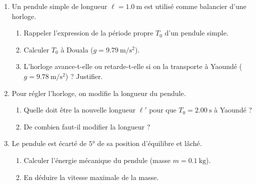 \begin{enumerate}[label=\arabic*)]
    \item Un pendule simple de longueur $\ell = \SI{1.0}{\metre}$ est utilisé comme balancier d'une horloge.
    \begin{enumerate}[label=\alph*)]
        \item Rappeler l'expression de la période propre $T_0$ d'un pendule simple.
        \item Calculer $T_0$ à Douala ($g = \SI{9.79}{\metre\per\second\squared}$).
        \item L'horloge avance-t-elle ou retarde-t-elle si on la transporte à Yaoundé ($g = \SI{9.78}{\metre\per\second\squared}$) ? Justifier.
    \end{enumerate}
    \item Pour régler l'horloge, on modifie la longueur du pendule.
    \begin{enumerate}[label=\alph*)]
        \item Quelle doit être la nouvelle longueur $\ell'$ pour que $T_0 = \SI{2.00}{\second}$ à Yaoundé ?
        \item De combien faut-il modifier la longueur ?
    \end{enumerate}
    \item Le pendule est écarté de $\ang{5}$ de sa position d'équilibre et lâché.
    \begin{enumerate}[label=\alph*)]
        \item Calculer l'énergie mécanique du pendule (masse $m = \SI{0.1}{\kilogram}$).
        \item En déduire la vitesse maximale de la masse.
    \end{enumerate}
\end{enumerate}

